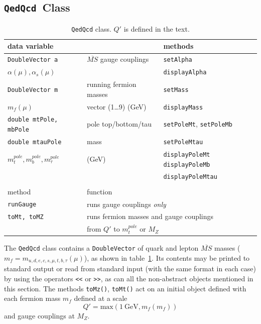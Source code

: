 \documentclass{article}
\def\code#1{\small{\tt #1}\normalsize}
\def\gev{~\mbox{GeV}}
\begin{document}
\subsection{\code{QedQcd}~Class}

\begin{table}\begin{center}\begin{tabular}{lll} 
data variable & & methods \\ \hline
\code{DoubleVector a} & $\overline{MS}$ gauge couplings & \code{setAlpha} \\
$\alpha(\mu),\alpha_s(\mu)$& &  \code{displayAlpha} \\ \hline
\code{DoubleVector m} & running fermion masses & \code{setMass}
\\ 
$m_f(\mu)$& vector (1\ldots 9) (GeV)&  \code{displayMass} \\ \hline
\code{double mtPole, mbPole} & pole top/bottom/tau & \code{setPoleMt},
\code{setPoleMb} \\
\code{double mtauPole} & mass & \code{setPoleMtau} \\
$m_t^{pole}, m_b^{pole}, m_\tau^{pole}$&(GeV) &  \code{displayPoleMt} \code{displayPoleMb}
\\
 & & \code{displayPoleMtau} \\
%
 &  & \\
method & \multicolumn{2}{l}{function} \\ \hline
\code{runGauge} & \multicolumn{2}{l}{runs gauge couplings {\em only}}\\
\code{toMt, toMZ} & \multicolumn{2}{l}{runs fermion masses and gauge couplings
} \\
 & \multicolumn{2}{l}{from $Q'$ to $m_t^{pole}$ or $M_Z$}\\
\end{tabular}\caption{\label{tab:qedqcd}\code{QedQcd} class. $Q'$ is defined in the text.}\end{center}\end{table}
The \code{QedQcd} class contains a \code{DoubleVector} of quark and lepton 
$\overline{MS}$ masses
($m_f=m_{u,d,e,c,s,\mu,t,b,\tau}(\mu)$), as shown in table~\ref{tab:qedqcd}.
Its contents may be printed to standard output or read from standard input
(with the same format in each 
case) by using the operators
\code{<<} or \code{>>}, as can all the non-abstract objects mentioned in this
section. The methods \code{toMz()}, \code{toMt()} act on an
initial object defined with each fermion mass $m_f$ defined at a scale
\begin{equation}
Q' = \mbox{max} (1 \gev, m_f(m_f)) \label{scaley}
\end{equation}
and gauge couplings at $M_Z$. 
\end{document}
